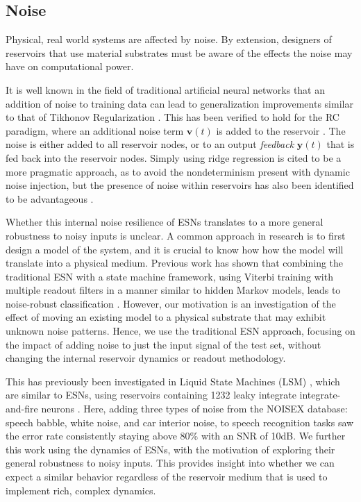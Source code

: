 \subsection{Noise}

Physical, real world systems are affected by noise. By extension, designers of
reservoirs that use material substrates must be aware of the effects the noise
may have on computational power.

It is well known in the field of traditional artificial neural networks that an
addition of noise to training data can lead to generalization improvements
similar to that of Tikhonov Regularization \cite{bishop_training_1995}. This has
been verified to hold for the RC paradigm, where an additional noise term
$\mathbf{v}(t)$ is added to the reservoir \cite{jaeger_echo_2001}. The noise is
either added to all reservoir nodes, or to an output \textit{feedback}
$\mathbf{y}(t)$ that is fed back into the reservoir nodes. Simply using ridge
regression is cited to be a more pragmatic approach, as to avoid the
nondeterminism present with dynamic noise injection, but the presence of noise
within reservoirs has also been identified to be advantageous
\cite{kurkova_stable_2008}.

Whether this internal noise resilience of ESNs translates to a more general
robustness to noisy inputs is unclear. A common approach in research is to first
design a model of the system, and it is crucial to know how how the model will
translate into a physical medium. Previous work has shown that combining the
traditional ESN with a state machine framework, using Viterbi training with
multiple readout filters in a manner similar to hidden Markov models, leads to
noise-robust classification \cite{skowronski_noise-robust_2007}. However, our
motivation is an investigation of the effect of moving an existing model to a
physical substrate that may exhibit unknown noise patterns. Hence, we use the
traditional ESN approach, focusing on the impact of adding noise to just the
input signal of the test set, without changing the internal reservoir dynamics
or readout methodology.

This has previously been investigated in Liquid State Machines (LSM)
\cite{maass_real-time_2002}, which are similar to ESNs, using reservoirs
containing 1232 leaky integrate integrate-and-fire neurons
\cite{verstraeten_isolated_2005}. Here, adding three types of noise from the
NOISEX database: speech babble, white noise, and car interior noise, to speech
recognition tasks saw the error rate consistently staying above 80\% with an SNR
of 10dB. We further this work using the dynamics of ESNs, with the motivation of
exploring their general robustness to noisy inputs. This provides insight into
whether we can expect a similar behavior regardless of the reservoir medium that
is used to implement rich, complex dynamics.

